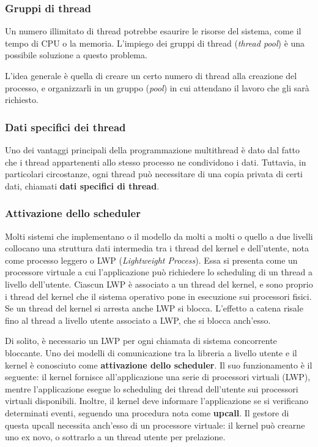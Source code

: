 \documentclass[11pt,a4paper]{article}
\begin{document}
\subsubsection{Gruppi di thread}
Un numero illimitato di thread potrebbe esaurire le risorse del sistema,
come il tempo di CPU o la memoria. L'impiego dei gruppi di thread (\emph{thread pool}) è una pos­sibile soluzione a questo problema.

L'idea generale è quella di creare un certo numero di thread alla creazione del proces­so, e organizzarli in un gruppo (\emph{pool}) in cui attendano il lavoro che gli sarà richiesto.

\subsubsection{Dati specifici dei thread}
Uno dei vantaggi principali della programmazione multithread è dato dal fatto che i thread
appartenenti allo stesso processo ne condividono i dati. Tuttavia, in particolari circostanze,
ogni thread può necessitare di una copia privata di certi dati, chiamati \textbf{dati specifici di
thread}.

\subsubsection{Attivazione dello scheduler}
Molti sistemi che implementano o il modello da molti a molti o quello a due livelli
collocano una struttura dati intermedia tra i thread del kernel e dell'utente, nota come processo leggero o LWP (\emph{Lightweight Process}). Essa si presenta co­me un processore virtuale a cui l'applicazione può richiedere lo scheduling di un thread a li­vello dell'utente. Ciascun LWP è associato a un thread del kernel, e sono proprio i thread del
kernel che il sistema operativo pone in esecuzione sui processori fisici. Se un thread del ker­nel si arresta anche
LWP si blocca. L'effetto a catena risale fino al thread a livello utente associato a LWP, che si
blocca anch'esso.

Di solito, è necessario un LWP per ogni chiamata di sistema concorrente
bloccante.
Uno dei modelli di comunicazione tra la libreria a livello utente e il kernel è conosciu­to come \textbf{attivazione dello scheduler}. Il suo funzionamento è il seguente: il kernel fornisce
all'applicazione una serie di processori virtuali (LWP), mentre l'applicazione esegue lo sche­duling dei thread dell'utente sui processori virtuali disponibili. Inoltre, il kernel deve infor­mare l'applicazione se si verificano determinati eventi, seguendo una procedura nota come
\textbf{upcall}.
Il gestore di questa upcall necessita anch'esso di un processore virtuale: il
kernel può crearne uno ex novo, o sottrarlo a un thread utente per prelazione.
\end{document}
